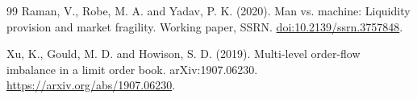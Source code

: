 \documentclass[12pt,a4paper]{article}
\newcommand{\doi}[1]{\href{https://doi.org/#1}{doi:#1}}
\begin{document}
\begin{thebibliography}{99}
Raman, V., Robe, M. A.  and Yadav, P. K. (2020).
\newblock Man vs. machine: Liquidity provision and market fragility.
\newblock Working paper, SSRN.
\newblock \doi{10.2139/ssrn.3757848}.

Xu, K., Gould, M. D.  and Howison, S. D. (2019).
\newblock Multi-level order-flow imbalance in a limit order book.
\newblock arXiv:1907.06230.
\newblock \url{https://arxiv.org/abs/1907.06230}.

\end{thebibliography}
\endgroup
\end{document}
